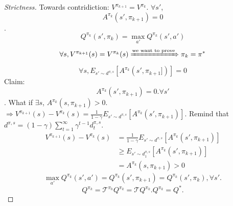 \documentclass{report}
\begin{document}
\begin{proof}[Strictness] Towards contridiction: $V^{\pi_{k+1}}=V^{\pi_{k}}$. $\forall s'$, \[
        A^{\pi_k}(s',\pi_{k+1})= 0 
    \]. \[
        Q^{\pi_k}(s',\pi_k)=\max_{a'}Q^{\pi_k}(s',a')
    \]
    \[ \forall s, V^{\pi_{k+1}}(s)=V^{\pi_{k}}(s) \xRightarrow{\text{we want to prove}} \pi_k=\pi^*\]
    \[
    \forall s, E_{s'\sim d^{\pi,s}}[A^{\pi_k}(s',\pi_{k+1}])]=0
    \]
    Claim: \[
    A^{\pi_k}(s',\pi_{k+1})=0. \forall s'
    \].
    What if $\exists s$, $A^{\pi_k}(s,\pi_{k+1})>0$. $\Rightarrow V^{\pi_{k+1}}(s)-V^{\pi_{k}}(s)=\frac{1}{1-\gamma}E_{s'\sim d^{\pi,s}}[A^{\pi_k}(s',\pi_{k+1})]$. Remind that $d^{\pi,s}=(1-\gamma)\sum_{t=1}^{\infty}\gamma^{t-1}d^{\pi,s}_t$.
    \begin{equation*}
        \begin{split}
            V^{\pi_{k+1}}(s)-V^{\pi_{k}}(s)&=\frac{1}{1-\gamma}E_{s'\sim d^{\pi,s}}[A^{\pi_k}(s',\pi_{k+1})]\\
            &\geq E_{s'\sim d_1^{\pi,s}}[A^{\pi_k}(s',\pi_{k+1})]\\
            &= A^{\pi_k}(s,\pi_{k+1}) > 0
        \end{split}
    \end{equation*}
    \[
    \max_{a'}Q^{\pi_k}(s',a')=Q^{\pi_k}(s',\pi_{k+1})=Q^{\pi_k}(s',\pi_{k}), \forall s'.
    \]
    \[
        Q^{\pi_k}=\mathcal{T}^{\pi_k}Q^{\pi_k}=\mathcal{T}Q^{\pi_k}. Q^{\pi_k}= Q^*.
    \]
\end{proof}
\printbibliography
\end{document}
